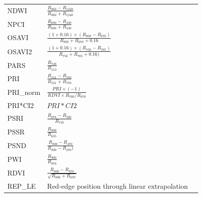\documentclass[remotesensing,article,submit,moreauthors,pdftex]{Definitions/mdpi}
\begin{document}
{\begin{supertabular}{lll}
		NDWI            & $\frac{R_{860}-R_{1240}}{R_{860}+R_{1240}}$                                                          & \cite{gao1996}                \\
		NPCI            & $\frac{R_{680}-R_{430}}{R_{680}+R_{430}}$                                                            & \cite{penuelas1994}           \\
		OSAVI           & $\frac{(1+0.16) \times (R_{800}-R_{670})}{R_{800}+R_{670}+0.16 }$                                    & \cite{rondeaux1996}           \\
		OSAVI2          & $\frac{(1+0.16)\times (R_{750}-R_{705})}{R_{750}+R_{705}+0.16) }$                                    & \cite{wu2008}                \\
		PARS            & $\frac{R_{746}}{R_{513}}$                                                                            & \cite{chappelle1992}          \\
		PRI             & $\frac{R_{531}-R_{570}}{R_{531}+R_{570}}$                                                            & \cite{gamon1992}              \\
		PRI\_norm       & $\frac{PRI \times (-1) }{RDVI\times R_{700}/R_{670}}$                                                & \cite{zarco-tejada2013}      \\
		PRI*CI2         & $PRI*CI2$                                                                                            & \cite{garrity2011}            \\
		PSRI            & $\frac{R_{678}-R_{500}}{R_{750}}$                                                                    & \cite{merzlyak1999}           \\
		PSSR            & $\frac{R_{800}}{R_{635}}$                                                                            & \cite{blackburn1998}          \\
		PSND            & $\frac{R_{800}-R_{470}}{R_{800}-R_{470})}$                                                           & \cite{blackburn1998}          \\
		PWI             & $\frac{R_{900}}{R_{970}}$                                                                            & \cite{penuelas1997}           \\
		RDVI            & $\frac{R_{800}-R_{670}}{ \sqrt{R_{800}+R_{670}}}$                                                    & \cite{roujean1995}            \\
		\midrule
		REP\_LE         & \parbox{3.8cm}{Red-edge position through linear extrapolation}                                       & \cite{cho2006}                \\

\end{supertabular}}
\end{document}
